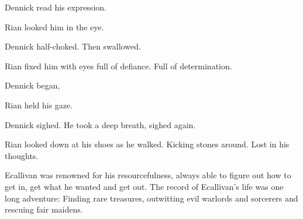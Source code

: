 Dennick read his expression. 

Rian looked him in the eye. 

Dennick half-choked. 
Then swallowed. 

Rian fixed him with eyes full of defiance. 
Full of determination. 

 Dennick began, 

Rian held his gaze. 

Dennick sighed. 
He took a deep breath, sighed again. 










\begin{comment}
\section{Rian in the garden}
\end{comment}

\begin{comment}
\subsection{Navel-gazing}
\end{comment}

Rian looked down at his shoes as he walked. 
Kicking stones around. 
Lost in his thoughts. 

Ecallivan was renowned for his resourcefulness, always able to figure out how to get in, get what he wanted and get out. 
The record of Ecallivan's life was one long adventure: 
Finding rare treasures, outwitting evil warlords and sorcerers and rescuing fair maidens. 



